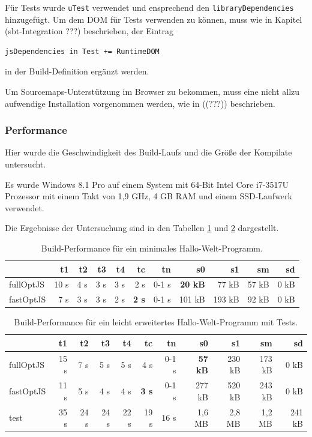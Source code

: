 \documentclass[a4paper, 12pt, hidelinks, listof=totoc, listoftables=totoc, bibliography=totoc]{scrreprt}
\newcommand{\code}[1]{\lstinline[language=Scala, style=inline]|#1|}
\begin{document}
Für Tests wurde \code{uTest} verwendet und ensprechend den \code{libraryDependencies} hinzugefügt. Um dem DOM für Tests verwenden zu können, muss wie in Kapitel (sbt-Integration ???) beschrieben, der Eintrag
\begin{lstlisting}[style=snippet]
jsDependencies in Test += RuntimeDOM
\end{lstlisting}
in der Build-Definition ergänzt werden.

Um Sourcemaps-Unterstützung im Browser zu bekommen, muss eine nicht allzu aufwendige Installation vorgenommen werden, wie in ((???)) beschrieben.

\subsubsection{Performance}

Hier wurde die Geschwindigkeit des Build-Laufs und die Größe der Kompilate untersucht.

Es wurde Windows 8.1 Pro auf einem System mit 64-Bit Intel Core i7-3517U Prozessor mit einem Takt von 1,9 GHz, 4 GB RAM und einem SSD-Laufwerk verwendet.

Die Ergebnisse der Untersuchung sind in den Tabellen \ref{table:compiler-performance1} und \ref{table:compiler-performance2} dargestellt.

\medskip

\begin{table}[!h]
\begin{tabular}{|l|r|r|r|r|r|r||r|r|r|r|}
\hline           & t1   & t2   & t3   & t4   & tc            & tn    & s0             & s1     & sm    & sd    \\ 
\hline fullOptJS & 10 s &  4 s &  3 s &  3 s &          2 s  & 0-1 s & \textbf{20 kB} &  77 kB & 57 kB &  0 kB \\ 
\hline fastOptJS &  7 s &  3 s &  3 s &  2 s &  \textbf{2 s} & 0-1 s &        101 kB  & 193 kB & 92 kB &  0 kB \\ 
\hline 
\end{tabular} 
\caption{Build-Performance für ein minimales Hallo-Welt-Programm.}
\label{table:compiler-performance1}
\end{table}

\medskip

\begin{table}[!h]
\begin{tabular}{|l|r|r|r|r|r|r||r|r|r|r|}
\hline           & t1   & t2   & t3   & t4   & tc            & tn    & s0             & s1     & sm     & sd     \\ 
\hline fullOptJS & 15 s &  7 s &  5 s &  5 s &          4 s  & 0-1 s & \textbf{57 kB} & 230 kB & 173 kB &   0 kB \\ 
\hline fastOptJS & 11 s &  5 s &  4 s &  4 s &  \textbf{3 s} & 0-1 s &        277 kB  & 520 kB & 243 kB &   0 kB \\ 
\hline test      & 35 s & 24 s & 24 s & 22 s &         19 s  &  16 s &        1,6 MB  & 2,8 MB & 1,2 MB & 241 kB \\ 
\hline 
\end{tabular} 
\caption{Build-Performance für ein leicht erweitertes Hallo-Welt-Programm mit Tests.}
\label{table:compiler-performance2}
\end{table}
\end{document}
